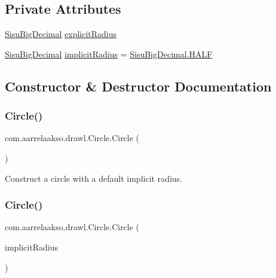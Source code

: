 \subsection*{Private Attributes}
\begin{DoxyCompactItemize}
\item 
\hyperlink{classcom_1_1aarrelaakso_1_1drawl_1_1_sisu_big_decimal}{Sisu\+Big\+Decimal} \hyperlink{classcom_1_1aarrelaakso_1_1drawl_1_1_circle_a8e3fa774b3fb8e64c8e1f0381a96df5e}{explicit\+Radius}
\item 
\hyperlink{classcom_1_1aarrelaakso_1_1drawl_1_1_sisu_big_decimal}{Sisu\+Big\+Decimal} \hyperlink{classcom_1_1aarrelaakso_1_1drawl_1_1_circle_a44419c5eba485de9b3dc2d8092be4e19}{implicit\+Radius} = \hyperlink{classcom_1_1aarrelaakso_1_1drawl_1_1_sisu_big_decimal_ae01ee6ac57cabf393e59465704a62f2c}{Sisu\+Big\+Decimal.\+H\+A\+LF}
\end{DoxyCompactItemize}


\subsection{Constructor \& Destructor Documentation}
\mbox{\label{classcom_1_1aarrelaakso_1_1drawl_1_1_circle_a18cd01a953d72d49941bc8211f50d268}} 
\subsubsection{\texorpdfstring{Circle()}{Circle()}\hspace{0.1cm}{\footnotesize\ttfamily [1/2]}}
{\footnotesize\ttfamily com.\+aarrelaakso.\+drawl.\+Circle.\+Circle (\begin{DoxyParamCaption}{ }\end{DoxyParamCaption})}

Construct a circle with a default implicit radius. \mbox{\label{classcom_1_1aarrelaakso_1_1drawl_1_1_circle_a8137fc064c1c7ce86fed179b56be9ab5}} 
\subsubsection{\texorpdfstring{Circle()}{Circle()}\hspace{0.1cm}{\footnotesize\ttfamily [2/2]}}
{\footnotesize\ttfamily com.\+aarrelaakso.\+drawl.\+Circle.\+Circle (\begin{DoxyParamCaption}\item[{\hyperlink{classcom_1_1aarrelaakso_1_1drawl_1_1_sisu_big_decimal}{Sisu\+Big\+Decimal}}]{implicit\+Radius }\end{DoxyParamCaption})\hspace{0.3cm}{\ttfamily [protected]}}

